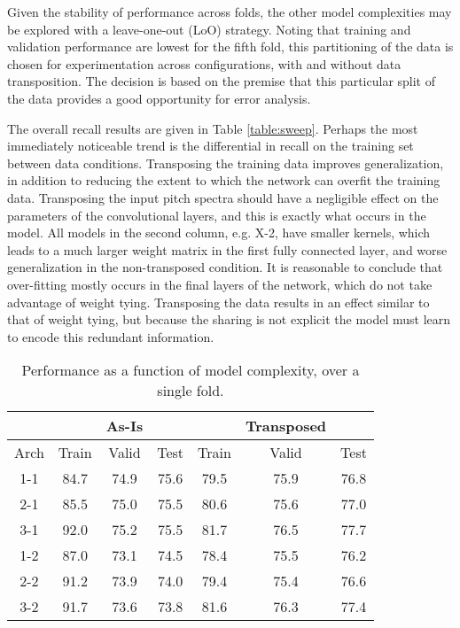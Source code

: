 Given the stability of performance across folds, the other model complexities may be explored with a leave-one-out (LoO) strategy.
Noting that training and validation performance are lowest for the fifth fold, this partitioning of the data is chosen for experimentation across configurations, with and without data transposition.
The decision is based on the premise that this particular split of the data provides a good opportunity for error analysis.

The overall recall results are given in Table \ref{table:sweep}.
Perhaps the most immediately noticeable trend is the differential in recall on the training set between data conditions.
Transposing the training data improves generalization, in addition to reducing the extent to which the network can overfit the training data.
Transposing the input pitch spectra should have a negligible effect on the parameters of the convolutional layers, and this is exactly what occurs in the model.
All models in the second column, e.g. X-2, have smaller kernels, which leads to a much larger weight matrix in the first fully connected layer, and worse generalization in the non-transposed condition.
It is reasonable to conclude that over-fitting mostly occurs in the final layers of the network, which do not take advantage of weight tying.
Transposing the data results in an effect similar to that of weight tying, but because the sharing is not explicit the model must learn to encode this redundant information.


\begin{table}[!t]
\caption{Performance as a function of model complexity, over a single fold.}
\label{table:exp2res}
\centering
\begin{tabular}{ c || c c c || c c c |}
& & As-Is & & & Transposed & \\
 \hline
Arch & Train & Valid & Test & Train & Valid & Test \\
\hline
1-1 & 84.7 & 74.9 & 75.6 & 79.5 & 75.9 & 76.8 \\
2-1 & 85.5 & 75.0 & 75.5 & 80.6 & 75.6 & 77.0 \\
3-1 & 92.0 & 75.2 & 75.5 & 81.7 & 76.5 & 77.7 \\
\hline
1-2 & 87.0 & 73.1 & 74.5 & 78.4 & 75.5 & 76.2 \\
2-2 & 91.2 & 73.9 & 74.0 & 79.4 & 75.4 & 76.6 \\
3-2 & 91.7 & 73.6 & 73.8 & 81.6 & 76.3 & 77.4 \\
\hline
\end{tabular}
\end{table}


